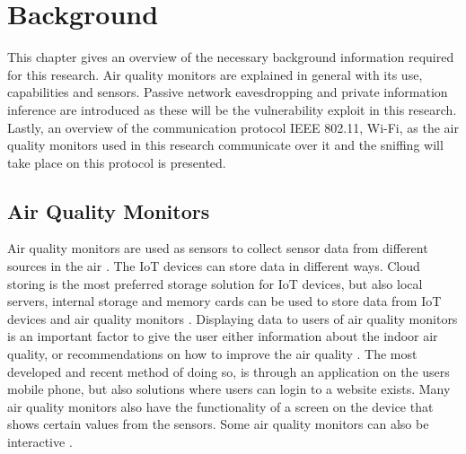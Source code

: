\chapter{Background}
This chapter gives an overview of the necessary background information required for this research. Air quality monitors are explained in general with its use, capabilities and sensors. Passive network eavesdropping and private information inference are introduced as these will be the vulnerability exploit in this research. Lastly, an overview of the communication protocol IEEE 802.11, \gls{Wi-Fi}, as the air quality monitors used in this research communicate over it and the sniffing will take place on this protocol is presented.

\section{Air Quality Monitors}
Air quality monitors are used as sensors to collect sensor data from different sources in the air \cite{GeneralAirQualityMonitor}. The \gls{IoT} devices can store data in different ways. Cloud storing is the most preferred storage solution for \gls{IoT} devices, but also local servers, internal storage and memory cards can be used to store data from \gls{IoT} devices and air quality monitors \cite{AQMBigSource}. Displaying data to users of air quality monitors is an important factor to give the user either information about the indoor air quality, or recommendations on how to improve the air quality \cite{AQMBigSource}. The most developed and recent method of doing so, is through an application on the users mobile phone, but also solutions where users can login to a website exists. Many air quality monitors also have the functionality of a screen on the device that shows certain values from the sensors. Some air quality monitors can also be interactive \cite{AQMBigSource}.

